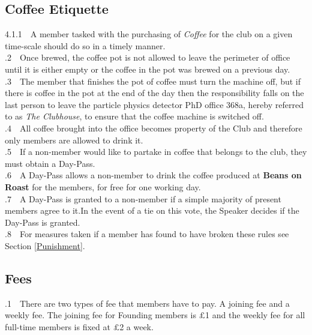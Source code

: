 \documentclass[a4paper,11pt]{article}
\begin{document}
\subsection{Coffee Etiquette}
4.1.1$\quad$A member tasked with the purchasing of \textit{Coffee} for the club on a given time-scale should do so in a timely manner.\\


.2$\quad$Once brewed, the coffee pot is not allowed to leave the perimeter of office until it is either empty or the coffee in the pot was brewed on a previous day.\\ 

.3$\quad$The member that finishes the pot of coffee must turn the machine off, but if there is coffee in the pot at the end of the day then the responsibility falls on the last person to leave the particle physics detector PhD office 368a, hereby referred to as \textit{The Clubhouse}, to ensure that the coffee machine is switched off. \\

.4$\quad$All coffee brought into the office becomes property of the Club and therefore only members are allowed to drink it.\\

.5$\quad$If a non-member would like to partake in coffee that belongs to the club, they must obtain a Day-Pass.\\

.6$\quad$A Day-Pass allows a non-member to drink the coffee produced at \textbf{Beans on Roast} for the members, for free for one working day.\\

.7$\quad$A Day-Pass is granted to a non-member if a simple majority of present members agree to it.In the event of a tie on this vote, the Speaker decides if the Day-Pass is granted.\\  

.8$\quad$For measures taken if a member has found to have broken these rules see Section \ref{Punishment}.\\


\subsection{Fees}
.1$\quad$There are two types of fee that members have to pay. A joining fee and a weekly fee. The joining fee for Founding members is $\pounds$1 and the weekly fee for all full-time members is fixed at $\pounds$2 a week.\\
\end{document}
